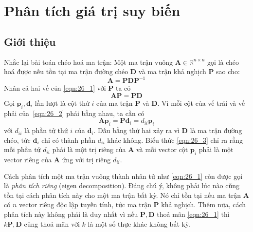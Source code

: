 \chapter{Phân tích giá trị suy biến}
\label{cha:svd} 
\section{Giới thiệu}
Nhắc lại bài toán chéo hoá ma trận: Một ma trận vuông $\mathbf{A} \in \mathbb{R}^{n\times n}$ gọi là {chéo hoá được} nếu tồn tại ma trận đường chéo $\mathbf{D}$ và ma trận khả nghịch $\mathbf{P}$ sao cho: 
\begin{equation} 
\label{eqn:26_1}
\mathbf{A} = \mathbf{P} \mathbf{D} \mathbf{P}^{-1} 
\end{equation} 
Nhân cả hai vế của \eqref{eqn:26_1} với $\mathbf{P}$ ta có
\begin{equation} 
    \label{eqn:26_2}
    \mathbf{AP} = \mathbf{PD} 
\end{equation} 
Gọi $\mathbf{p}_i, \mathbf{d}_i$ lần lượt là cột thứ $i$ của ma trận
$\mathbf{P}$ và $\mathbf{D}$. Vì mỗi cột của vế trái và vế phải
của~\eqref{eqn:26_2} phải bằng nhau, ta cần có
\begin{equation} 
\label{eqn:26_3}
    \mathbf{Ap}_i = \mathbf{Pd}_i = d_{ii}\mathbf{p}_i
\end{equation} 
với $d_{ii}$ là phần tử thứ $i$ của $\mathbf{d}_i$. Dấu bằng thứ hai xảy ra vì
$\mathbf{D}$ là ma trận đường chéo, tức $\mathbf{d}_i$ chỉ có thành phần
$d_{ii}$ khác không. Biểu thức \eqref{eqn:26_3} chỉ ra rằng mỗi phần tử $d_{ii}$
phải là một {trị riêng} của $\mathbf{A}$ và mỗi vector cột $\mathbf{p}_i$ phải
là một {vector riêng} của $\mathbf{A}$ ứng với trị riêng $d_{ii}$.


Cách phân tích một ma trận vuông thành nhân tử như \eqref{eqn:26_1} còn được gọi
là \textit{phân tích riêng} (eigen decomposition). Đáng chú ý, không phải lúc nào cũng tồn tại cách phân tích này cho một ma trận bất kỳ. Nó chỉ tồn
tại nếu ma trận $\mathbf{A}$ có $n$ vector riêng độc lập tuyến tính, tức ma trận $\mathbf{P}$ khả nghịch. Thêm nữa, cách phân
tích này không phải là duy nhất vì nếu $\mathbf{P}, \mathbf{D}$ thoả mãn
\eqref{eqn:26_1} thì $k\mathbf{P}, \mathbf{D}$ cũng thoả mãn với $k$ là một số
thực khác không bất kỳ.
 
